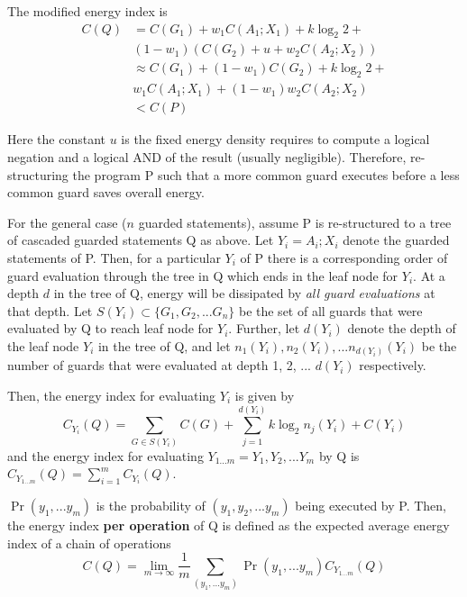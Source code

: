 The modified energy index is 
\begin{equation}
\begin{split}
	C(Q) &= C(G_1) + w_1 C(A_1; X_1) + k \log_2{2} +\\
		& (1 - w_1) (C(G_2) + u + w_2 C(A_2; X_2)) \\
		&\approx C(G_1) + (1 - w_1) C(G_2) + k \log_2{2} + \\
		& w_1 C(A_1; X_1) + (1 - w_1) w_2 C(A_2; X_2)\\
		&< C(P)
\end{split}
\end{equation}

Here the constant $u$ is the fixed energy density requires to compute a logical
negation and a logical AND of the result (usually negligible). 
Therefore, re-structuring the program P such that a more common
guard executes before a less common guard saves overall energy.

For the general case ($n$ guarded statements), assume 
P is re-structured to a tree of cascaded guarded statements Q as above. 
Let $Y_i = A_i; X_i$ denote the guarded statements of P.
Then, for a particular $Y_i$ of P there is a corresponding order of guard
evaluation through the tree in Q which ends in the leaf node for $Y_i$.
At a depth $d$ in the tree of Q, energy will be dissipated by \emph{all guard
evaluations} at that depth. Let $S(Y_i) \subset \{G_1, G_2, ... G_n\}$ be the set
of all guards that were evaluated by Q to reach leaf node for $Y_i$. Further,
let $d(Y_i)$ denote the depth of the leaf node $Y_i$ in the tree of Q, and let
$n_1(Y_i), n_2(Y_i), ... n_{d(Y_i)}(Y_i)$ be the number of guards that were
evaluated at depth 1, 2, ... $d(Y_i)$ respectively.

Then, the energy index for evaluating $Y_i$ is given by
\begin{equation}
	C_{Y_i}(Q) = \sum_{G \in S(Y_i)} C(G) + \sum_{j = 1}^{d(Y_i)} k 
	\log_2{n_j(Y_i)} + C(Y_i)
\end{equation}
and the energy index for evaluating $Y_{1...m} = Y_1, Y_2, ... Y_m$ by Q is
$C_{Y_{1...m}}(Q) = \sum_{i = 1}^{m} C_{Y_i}(Q)$. 

\begin{defn}
	$\Pr(y_1,...y_m)$ is the probability of $(y_1, y_2, ...y_m)$ being executed
	by P. Then, the energy index \textbf{per operation} of Q is defined as the expected average
	energy index of a chain of operations 
	\begin{equation}
		C(Q) = \lim_{m \to \infty} \frac{1}{m} \sum_{(y_1,...y_m)} \Pr(y_1,...y_m) C_{Y_{1...m}}(Q)
	\end{equation}
\end{defn}


